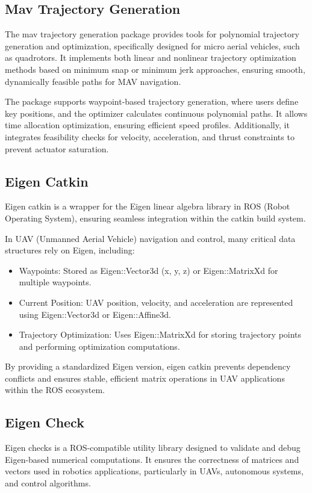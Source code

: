 \documentclass{article}
\begin{document}
\subsection{Mav Trajectory Generation}
The mav trajectory generation\cite{richter2016polynomial} package provides tools for
polynomial trajectory generation and optimization, specifically designed for micro aerial vehicles, such as quadrotors.
It implements both linear and nonlinear trajectory optimization methods based on minimum snap or minimum jerk approaches, ensuring smooth, dynamically feasible paths for MAV navigation.

The package supports waypoint-based trajectory generation, where users define key positions, and the optimizer calculates continuous polynomial paths. It allows time allocation optimization, ensuring efficient speed profiles. Additionally, it integrates feasibility checks for velocity, acceleration, and thrust constraints to prevent actuator saturation.


\subsection{Eigen Catkin}
Eigen catkin is a wrapper for the Eigen linear algebra library in ROS (Robot Operating System), ensuring seamless integration within the catkin build system.

In UAV (Unmanned Aerial Vehicle) navigation and control, many critical data structures rely on Eigen, including:
\begin{itemize}
    \item Waypoints: Stored as Eigen::Vector3d (x, y, z) or Eigen::MatrixXd for multiple waypoints.
    \item Current Position: UAV position, velocity, and acceleration are represented using Eigen::Vector3d or Eigen::Affine3d.
    \item Trajectory Optimization: Uses Eigen::MatrixXd for storing trajectory points and performing optimization computations.

\end{itemize}

By providing a standardized Eigen version, eigen catkin prevents dependency conflicts and ensures stable, efficient matrix operations in UAV applications within the ROS ecosystem.

\subsection{Eigen Check}
Eigen checks is a ROS-compatible utility library designed to validate and debug Eigen-based numerical computations. It ensures the correctness of matrices and vectors used in robotics applications, particularly in UAVs, autonomous systems, and control algorithms.
\end{document}

